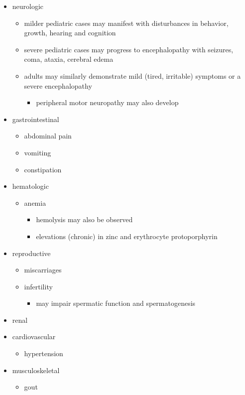 \begin{itemize}
	\item
	neurologic
	
	\begin{itemize}
		\item
		milder pediatric cases may manifest with disturbances in behavior, growth, hearing and cognition
		\item
		severe pediatric cases may progress to encephalopathy with seizures, coma, ataxia, cerebral edema
		\item
		adults may similarly demonstrate mild (tired, irritable) symptoms or a severe encephalopathy
		
		\begin{itemize}
			\item
			peripheral motor neuropathy may also develop
		\end{itemize}
	\end{itemize}
	\item
	gastrointestinal
	
	\begin{itemize}
		\item
		abdominal pain
		\item
		vomiting
		\item
		constipation
	\end{itemize}
	\item
	hematologic
	
	\begin{itemize}
		\item
		anemia
		
		\begin{itemize}
			\item
			hemolysis may also be observed
			\item
			elevations (chronic) in zinc and erythrocyte protoporphyrin
		\end{itemize}
	\end{itemize}
	\item
	reproductive
	
	\begin{itemize}
		\item
		miscarriages
		\item
		infertility
		
		\begin{itemize}
			\item
			may impair spermatic function and spermatogenesis
		\end{itemize}
	\end{itemize}
	\item
	renal
	\item
	cardiovascular
	
	\begin{itemize}
		\item
		hypertension
	\end{itemize}
	\item
	musculoskeletal
	
	\begin{itemize}
		\item
		gout
	\end{itemize}
\end{itemize}


